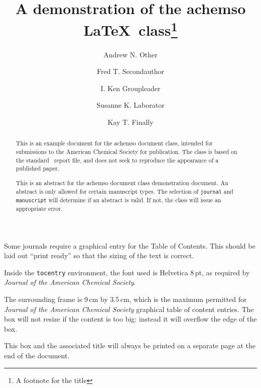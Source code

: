 \documentclass[journal=jacsat,manuscript=article]{achemso}
\author{Andrew N. Other}
\author{Fred T. Secondauthor}
\author{I. Ken Groupleader}
\affiliation[Unknown University]
{Department of Chemistry, Unknown University, Unknown Town}
\author{Susanne K. Laborator}
\affiliation[BigPharma]
{Lead Discovery, BigPharma, Big Town, USA}
\author{Kay T. Finally}
\affiliation[Unknown University]
{Department of Chemistry, Unknown University, Unknown Town}
\title[An \textsf{achemso} demo]
  {A demonstration of the \textsf{achemso} \LaTeX\
   class\footnote{A footnote for the title}}
\begin{document}
\begin{tocentry}

Some journals require a graphical entry for the Table of Contents.
This should be laid out ``print ready'' so that the sizing of the
text is correct.

Inside the \texttt{tocentry} environment, the font used is Helvetica
8\,pt, as required by \emph{Journal of the American Chemical
Society}.

The surrounding frame is 9\,cm by 3.5\,cm, which is the maximum
permitted for  \emph{Journal of the American Chemical Society}
graphical table of content entries. The box will not resize if the
content is too big: instead it will overflow the edge of the box.

This box and the associated title will always be printed on a
separate page at the end of the document.

\end{tocentry}

\begin{abstract}
  This is an example document for the \textsf{achemso} document
  class, intended for submissions to the American Chemical Society
  for publication. The class is based on the standard \LaTeXe\
  \textsf{report} file, and does not seek to reproduce the appearance
  of a published paper.

  This is an abstract for the \textsf{achemso} document class
  demonstration document.  An abstract is only allowed for certain
  manuscript types.  The selection of \texttt{journal} and
  \texttt{manuscript} will determine if an abstract is valid.  If
  not, the class will issue an appropriate error.
\end{abstract}

\end{document}
